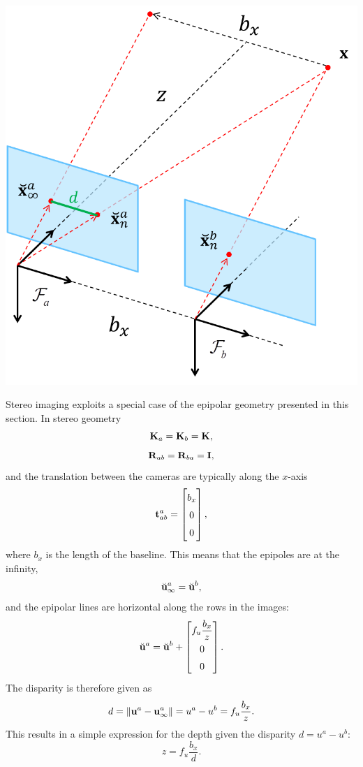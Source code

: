 \begin{example}[frametitle=Stereo geometry]
{
  \centering
  \includegraphics[width=0.6\columnwidth]{figures/stereo-geometry.png}
  \captionsetup{type=figure}
  \label{fig:stereo-geometry}
  \par
}
Stereo imaging exploits a special case of the epipolar geometry presented in this section.
In stereo geometry
\begin{equation}
  {\boldsymbol{\mathbf{K}}}_a = {\boldsymbol{\mathbf{K}}}_b = {\boldsymbol{\mathbf{K}}},
\end{equation}
\begin{equation}
  {\boldsymbol{\mathbf{R}}}_{ab} = {\boldsymbol{\mathbf{R}}}_{ba} = {\boldsymbol{\mathbf{I}}}, 
\end{equation}
and the translation between the cameras are typically along the $x$-axis
\begin{equation}
  \vect^a_{ab} = 
  \begin{bmatrix}
    b_x\\
    0\\
    0
  \end{bmatrix},
\end{equation}
where $b_x$ is the length of the baseline.
This means that the epipoles are at the infinity, 
\begin{equation}
  \breve{{\boldsymbol{\mathbf{u}}}}^a_{\infty} = \breve{{\boldsymbol{\mathbf{u}}}}^b,
\end{equation}
and the epipolar lines are horizontal along the rows in the images:
\begin{equation}
  \breve{\vecu}^{a} = \breve{\vecu}^b + 
  \renewcommand\arraystretch{1.5}
  \begin{bmatrix}
    f_u\dfrac{b_x}{z}\\
    0\\
    0
  \end{bmatrix}.
\end{equation}
The disparity is therefore given as
\begin{equation}
  d = \left\lVert{\boldsymbol{\mathbf{u}}}^a - {\boldsymbol{\mathbf{u}}}^a_\infty\right\rVert = u^a - u^b = f_u\dfrac{b_x}{z}.
\end{equation}
This results in a simple expression for the depth given the disparity $d = u^a - u^b$:
\begin{equation}
  z = f_u\dfrac{b_x}{d}.
\end{equation}
\end{example}

